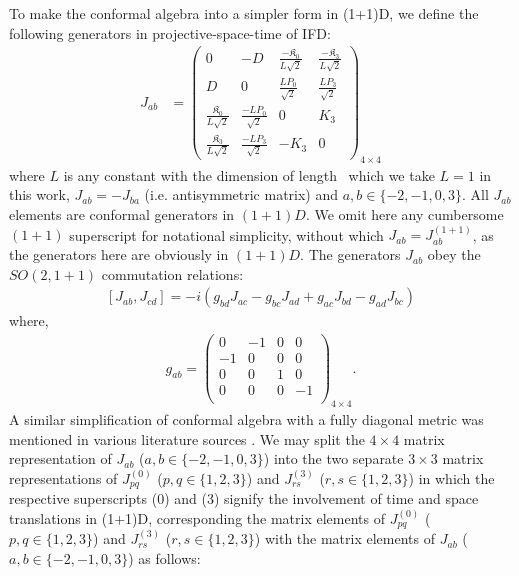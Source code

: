 \documentclass[%
 reprint,
superscriptaddress,
 amsmath,amssymb,
 aps,
]{revtex4-2}
\begin{document}
To make the conformal algebra into a simpler form in (1+1)D, we define the following generators in projective-space-time of IFD:
\begin{align}\label{Jab}
  J_{ab}&=
  \begin{pmatrix}
  0&-D&\frac{-\mathfrak{K}_0}{L\sqrt{2}}&\frac{-\mathfrak{K}_3}{L\sqrt{2}}\\
  D&0&\frac{LP_0}{\sqrt{2}}&\frac{LP_3}{\sqrt{2}}\\
    \frac{\mathfrak{K}_0}{L\sqrt{2}}&\frac{-LP_0}{\sqrt{2}}&0  & K_{3}\\
    \frac{\mathfrak{K}_3}{L\sqrt{2}}&\frac{-LP_3}{\sqrt{2}}&-K_{3} & 0
  \end{pmatrix}_{4\times4}
\end{align}
where $L$ is any constant with the dimension of length~\cite{Fubini1976} which we take $L=1$ in this work, $J_{ab}=-J_{ba}$ (i.e. antisymmetric matrix) and $a,b\in\{-2,-1,0,3\}$. All $J_{ab}$ elements are conformal generators in $(1+1)D$. We omit here any cumbersome $(1+1)$ superscript for notational simplicity, without which $J_{ab} = J^{(1+1)}_{ab}$, as the generators here are obviously in $(1+1)D$. The generators $J_{ab}$ obey the $SO(2,1+1)$ commutation relations:
  \begin{align}\label{JabalgebraIFD}
      \left[J_{{a}{b}},J_{{c}{d}}\right]=-i\left(g_{{b}{d}}J_{{a}{c}}-g_{{b}{c}}J_{{a}{d}}+g_{{a}{c}}J_{{b}{d}}-g_{{a}{d}}J_{{b}{c}}\right)
  \end{align}
where, 
  \begin{align}\label{metric}
      g_{ab}=\begin{pmatrix}
  0&-1&0&0\\
  -1&0&0&0\\
  0&0&1&0\\
  0&0&0&-1\\
  \end{pmatrix}_{4\times4}.
  \end{align}
A similar simplification of conformal algebra with a fully diagonal metric was mentioned in various literature sources \cite{SalamMack1969, Francesco}. We may split the $4\times4$ matrix representation of $J_{ab}$ ($a,b\in\{-2,-1,0,3\}$) into the two separate $3\times3$ matrix representations of $J^{(0)}_{pq}$ ($p,q\in\{1,2,3\}$) and $J^{(3)}_{rs}$ ($r,s\in\{1,2,3\}$) in which the respective superscripts (0) and (3) signify the involvement of time and space translations in (1+1)D, corresponding the matrix elements of $J^{(0)}_{pq}$ ($p,q\in\{1,2,3\}$) and $J^{(3)}_{rs}$ ($r,s\in\{1,2,3\}$) with the matrix elements of $J_{ab}$ ($a,b\in\{-2,-1,0,3\}$) as follows:
\end{document}
